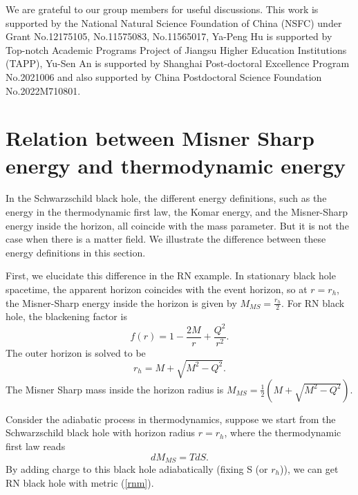 \documentclass[a4paper,11pt]{article}
\begin{document}
\begin{acknowledgments}
We are grateful to our group members for useful discussions. This work is supported by the National Natural Science Foundation of China (NSFC) under Grant No.12175105, No.11575083, No.11565017, Ya-Peng Hu is supported by Top-notch Academic Programs Project of Jiangsu Higher Education Institutions (TAPP), Yu-Sen An is supported by Shanghai Post-doctoral Excellence Program No.2021006 and also supported by China Postdoctoral Science Foundation No.2022M710801.
\end{acknowledgments}

\appendix
\section{Relation between Misner Sharp energy and thermodynamic energy }\label{secdil}
In the Schwarzschild black hole, the different energy definitions, such as the energy in the thermodynamic first law, the Komar energy, and the Misner-Sharp energy inside the horizon, all coincide with the mass parameter. But it is not the case when there is a matter field. We illustrate the difference between these energy definitions in this section. 

First, we elucidate this difference in the RN example. 
In stationary black hole spacetime, the apparent horizon coincides with the event horizon, so at $r=r_{h}$, the Misner-Sharp energy inside the horizon is given by $M_{MS}=\frac{r_{h}}{2}$. 
For RN black hole, the blackening factor is 
\begin{equation} \label{rnm}
f(r)=1-\frac{2M}{r}+\frac{Q^{2}}{r^{2}}.
\end{equation}
The outer horizon is solved to be 
\begin{equation}
r_{h}=M+\sqrt{M^{2}-Q^{2}}.
\end{equation}
The Misner Sharp mass inside the horizon radius is $M_{MS}=\frac{1}{2}(M+\sqrt{M^{2}-Q^{2}})$. 

Consider the adiabatic process in thermodynamics, suppose we start from the Schwarzschild black hole with horizon radius $r=r_{h}$, where the thermodynamic first law reads
\begin{equation}
dM_{MS}=TdS.
\end{equation}
By adding charge to this black hole adiabatically (fixing S (or $r_{h}$)), we can get RN black hole with metric (\ref{rnm}). 
\end{document}

